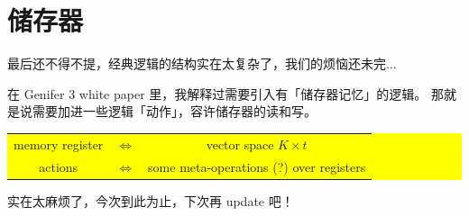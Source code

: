 \documentclass[12pt]{article}
\begin{document}
\section{储存器}

最后还不得不提，经典逻辑的结构实在太复杂了，我们的烦恼还未完...

在 Genifer 3 white paper 里，我解释过需要引入有「储存器记忆」的逻辑。  那就是说需要加进一些逻辑「动作」，容许储存器的读和写。

\begin{center}
\colorbox{yellow}{\parbox{0.85\textwidth}{
\begin{tabular}{ccc}
memory register & $\Leftrightarrow$ & vector space $K \times t$ \\ 
actions & $\Leftrightarrow$ & some meta-operations (?) over registers\\
\end{tabular}
}}
\end{center}

实在太麻烦了，今次到此为止，下次再 update 吧！
\end{document}
